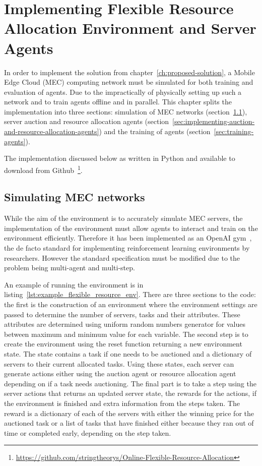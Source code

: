 

\chapter{Implementing Flexible Resource Allocation Environment and Server Agents}\label{ch:implementing-flexible-resource-allocation-environment-and-server-agents}
In order to implement the solution from chapter~\ref{ch:proposed-solution}, a Mobile Edge Cloud (MEC) computing network
must be simulated for both training and evaluation of agents. Due to the impractically of physically setting up
such a network and to train agents offline and in parallel. This chapter splits the implementation into three sections:
simulation of MEC networks (section~\ref{sec:simulating-mec-networks}), server auction and resource
allocation agents (section~\ref{sec:implementing-auction-and-resource-allocation-agents}) and the training of agents
(section~\ref{sec:training-agents}).

The implementation discussed below as written in Python and available to download from
Github~\footnote{\url{https://github.com/stringtheorys/Online-Flexible-Resource-Allocation}}.

\section{Simulating MEC networks}\label{sec:simulating-mec-networks}
While the aim of the environment is to accurately simulate MEC servers, the implementation of the environment must
allow agents to interact and train on the environment efficiently. Therefore it has been implemented
as an OpenAI gym~\citep{openaigym}, the de facto standard for implementing reinforcement learning environments by
researchers. However the standard specification must be modified due to the problem being multi-agent and multi-step.

An example of running the environment is in listing~\ref{lst:example_flexible_resource_env}. There are three
sections to the code: the first is the construction of an environment where the environment settings
are passed to determine the number of servers, tasks and their attributes. These attributes are determined using
uniform random numbers generator for values between maximum and minimum value for each variable. The second step is to
create the environment using the reset function returning a new environment state.
The state contains a task if one needs to be auctioned and a dictionary of servers to their current
allocated tasks. Using these states, each server can generate actions either using the auction agent or resource
allocation agent depending on if a task needs auctioning. The final part is to take a step using the server actions
that returns an updated server state, the rewards for the actions, if the environment is finished and extra information
from the steps taken. The reward is a dictionary of each of the servers with either the winning price for the auctioned
task or a list of tasks that have finished either because they ran out of time or completed early, depending on the
step taken.


